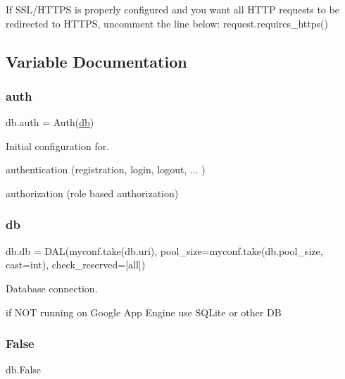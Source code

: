 If S\+S\+L/\+H\+T\+T\+PS is properly configured and you want all H\+T\+TP requests to be redirected to H\+T\+T\+PS, uncomment the line below\+: request.\+requires\+\_\+https() 

\subsection{Variable Documentation}
\mbox{\label{namespacedb_a711411a4b59aaa146400d3a3a950d6f8}} 
\subsubsection{\texorpdfstring{auth}{auth}}
{\footnotesize\ttfamily db.\+auth = Auth(\hyperlink{namespacedb_aed82679f33f702c99769be3e2586c03b}{db})}



Initial configuration for. 

authentication (registration, login, logout, ... )

authorization (role based authorization) \mbox{\label{namespacedb_aed82679f33f702c99769be3e2586c03b}} 
\subsubsection{\texorpdfstring{db}{db}}
{\footnotesize\ttfamily db.\+db = D\+AL(myconf.\+take(\textquotesingle{}db.\+uri\textquotesingle{}), pool\+\_\+size=myconf.\+take(\textquotesingle{}db.\+pool\+\_\+size\textquotesingle{}, cast=int), check\+\_\+reserved=\mbox{[}\textquotesingle{}all\textquotesingle{}\mbox{]})}



Database connection. 

if N\+OT running on Google App Engine use S\+Q\+Lite or other DB \mbox{\label{namespacedb_aa87a451fde49f3d7dcb13435106b4335}} 
\subsubsection{\texorpdfstring{False}{False}}
{\footnotesize\ttfamily db.\+False}

\mbox{\label{namespacedb_a638d59d03b2f6ef1306f0651967b2d6b}} 
